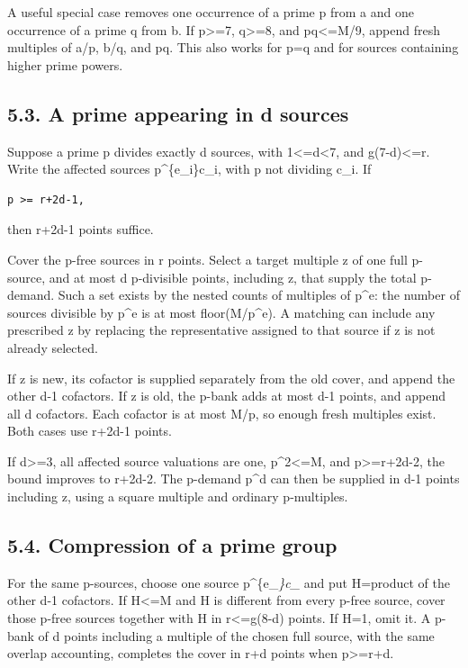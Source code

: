\documentclass[11pt,a4paper]{article}
\begin{document}
A useful special case removes one occurrence of a prime p from a and one
occurrence of a prime q from b. If p\textgreater=7, q\textgreater=8, and
pq\textless=M/9, append fresh multiples of a/p, b/q, and pq. This also
works for p=q and for sources containing higher prime powers.

\subsection{5.3. A prime appearing in d
sources}\label{a-prime-appearing-in-d-sources}

Suppose a prime p divides exactly d sources, with
1\textless=d\textless7, and g(7-d)\textless=r. Write the affected
sources p\^{}\{e\_i\}c\_i, with p not dividing c\_i. If

\begin{verbatim}
p >= r+2d-1,
\end{verbatim}

then r+2d-1 points suffice.

Cover the p-free sources in r points. Select a target multiple z of one
full p-source, and at most d p-divisible points, including z, that
supply the total p-demand. Such a set exists by the nested counts of
multiples of p\^{}e: the number of sources divisible by p\^{}e is at
most floor(M/p\^{}e). A matching can include any prescribed z by
replacing the representative assigned to that source if z is not already
selected.

If z is new, its cofactor is supplied separately from the old cover, and
append the other d-1 cofactors. If z is old, the p-bank adds at most d-1
points, and append all d cofactors. Each cofactor is at most M/p, so
enough fresh multiples exist. Both cases use r+2d-1 points.

If d\textgreater=3, all affected source valuations are one,
p\^{}2\textless=M, and p\textgreater=r+2d-2, the bound improves to
r+2d-2. The p-demand p\^{}d can then be supplied in d-1 points including
z, using a square multiple and ordinary p-multiples.

\subsection{5.4. Compression of a prime
group}\label{compression-of-a-prime-group}

For the same p-sources, choose one source p\^{}\{e\_\emph{\}c\_} and put
H=product of the other d-1 cofactors. If H\textless=M and H is different
from every p-free source, cover those p-free sources together with H in
r\textless=g(8-d) points. If H=1, omit it. A p-bank of d points
including a multiple of the chosen full source, with the same overlap
accounting, completes the cover in r+d points when p\textgreater=r+d.
\end{document}
